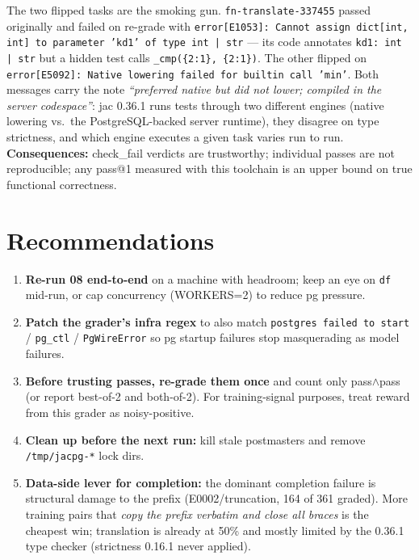 \documentclass[10pt,a4paper]{article}
\begin{document}
The two flipped tasks are the smoking gun. \texttt{fn-translate-337455} passed originally
and failed on re-grade with
\texttt{error[E1053]: Cannot assign dict[int, int] to parameter 'kd1' of type int | str}
--- its code annotates \texttt{kd1: int | str} but a hidden test calls
\texttt{\_cmp(\{2:1\}, \{2:1\})}. The other flipped on
\texttt{error[E5092]: Native lowering failed for builtin call 'min'}. Both messages carry
the note \emph{``preferred native but did not lower; compiled in the server codespace''}:
jac 0.36.1 runs tests through two different engines (native lowering vs.\ the
PostgreSQL-backed server runtime), they disagree on type strictness, and which engine
executes a given task varies run to run. \textbf{Consequences:} check\_fail verdicts are
trustworthy; individual passes are not reproducible; any pass@1 measured with this
toolchain is an upper bound on true functional correctness.

\section{Recommendations}

\begin{enumerate}
  \item \textbf{Re-run 08 end-to-end} on a machine with headroom; keep an eye on
        \texttt{df} mid-run, or cap concurrency (WORKERS=2) to reduce pg pressure.
  \item \textbf{Patch the grader's infra regex} to also match
        \texttt{postgres failed to start} / \texttt{pg\_ctl} / \texttt{PgWireError} so pg
        startup failures stop masquerading as model failures.
  \item \textbf{Before trusting passes, re-grade them once} and count only
        pass$\wedge$pass (or report best-of-2 and both-of-2). For training-signal
        purposes, treat reward from this grader as noisy-positive.
  \item \textbf{Clean up before the next run:} kill stale postmasters and remove
        \texttt{/tmp/jacpg-*} lock dirs.
  \item \textbf{Data-side lever for completion:} the dominant completion failure is
        structural damage to the prefix (E0002/truncation, 164 of 361 graded). More
        training pairs that \emph{copy the prefix verbatim and close all braces} is the
        cheapest win; translation is already at 50\% and mostly limited by the 0.36.1
        type checker (strictness 0.16.1 never applied).
\end{enumerate}
\end{document}
